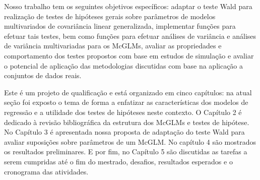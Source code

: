 Nosso trabalho tem os seguintes objetivos específicos: adaptar o teste Wald para realização de testes de hipóteses gerais sobre parâmetros de modelos multivariados de covariância linear generalizada, implementar funções para efetuar tais testes, bem como funções para efetuar análises de variância e análises de variância multivariadas para os McGLMs, avaliar as propriedades e comportamento dos testes propostos com base em estudos de simulação e avaliar o potencial de aplicação das metodologias discutidas com base na aplicação a conjuntos de dados reais.

Este é um projeto de qualificação e está organizado em cinco capítulos: na atual seção foi exposto o tema de forma a enfatizar as características dos modelos de regressão e a utilidade dos testes de hipóteses neste contexto. O Capítulo 2 é dedicado à revisão bibliográfica da estrutura dos McGLMs e testes de hipótese. No Capítulo 3 é apresentada nossa proposta de adaptação do teste Wald para avaliar suposições sobre parâmetros de um McGLM. No capítulo 4 são mostrados os resultados preliminares. E por fim, no Capítulo 5 são discutidas as tarefas a serem cumpridas até o fim do mestrado, desafios, resultados esperados e o cronograma das atividades.

